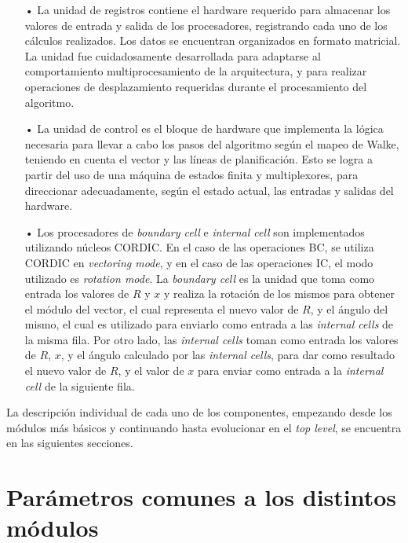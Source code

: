 \begin{itemize}
	\item[•] La unidad de registros contiene el hardware requerido para almacenar los valores de entrada y salida de los procesadores, registrando cada uno de los cálculos realizados. Los datos se encuentran organizados en formato matricial. La unidad fue cuidadosamente desarrollada para adaptarse al comportamiento multiprocesamiento de la arquitectura, y para realizar operaciones de desplazamiento requeridas durante el procesamiento del algoritmo.

	\item[•] La unidad de control es el bloque de hardware que implementa la lógica necesaria para llevar a cabo los pasos del algoritmo según el mapeo de Walke, teniendo en cuenta el vector y las líneas de planificación. Esto se logra a partir del uso de una máquina de estados finita y multiplexores, para direccionar adecuadamente, según el estado actual, las entradas y salidas del hardware.
	
	\item[•] Los procesadores de \textit{boundary cell} e \textit{internal cell} son implementados utilizando núcleos CORDIC. En el caso de las operaciones BC, se utiliza CORDIC en \textit{vectoring mode}, y en el caso de las operaciones IC, el modo utilizado es \textit{rotation mode}. La \textit{boundary cell} es la unidad que toma como entrada los valores de $R$ y $x$ y realiza la rotación de los mismos para obtener el módulo del vector, el cual representa el nuevo valor de $R$, y el ángulo del mismo, el cual es utilizado para enviarlo como entrada a las \textit{internal cells} de la misma fila. Por otro lado, las \textit{internal cells} toman como entrada los valores de $R$, $x$, y el ángulo calculado por las \textit{internal cells}, para dar como resultado el nuevo valor de $R$, y el valor de $x$ para enviar como entrada a la \textit{internal cell} de la siguiente fila.
\end{itemize}

La descripción individual de cada uno de los componentes, empezando desde los módulos más básicos y continuando hasta evolucionar en el \textit{top level}, se encuentra en las siguientes secciones.

\section{Parámetros comunes a los distintos módulos}

